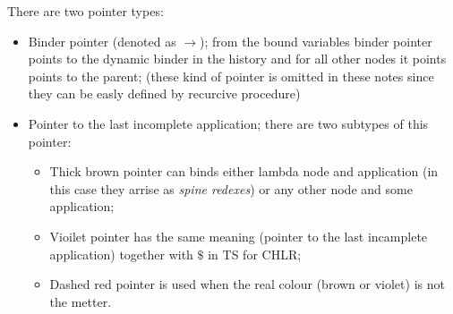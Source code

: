 \documentclass[a4paper, 10pt]{article}
\begin{document}
There are two pointer types:
\begin{itemize}
\item Binder pointer (denoted as {\color{green}$\rightarrow$});
  from the bound variables binder pointer points to the dynamic binder in the history
  and for all other nodes it points points to the parent;
  (these kind of pointer is omitted in these notes since they can
  be easly defined by recurcive procedure)
\item Pointer to the last incomplete application; there are two subtypes
  of this pointer:
  \begin{itemize}
  \item Thick brown pointer can binds either
    lambda node and application (in this case they arrise as \emph{spine redexes})
    or any other node and some application;
  \item Vioilet pointer has the same meaning
    (pointer to the last incamplete application) together with $\$$
    in TS for CHLR;
  \item Dashed red pointer is used when the real colour
    (brown or violet) is not the metter.    
  \end{itemize}
\end{itemize}
\end{document}
